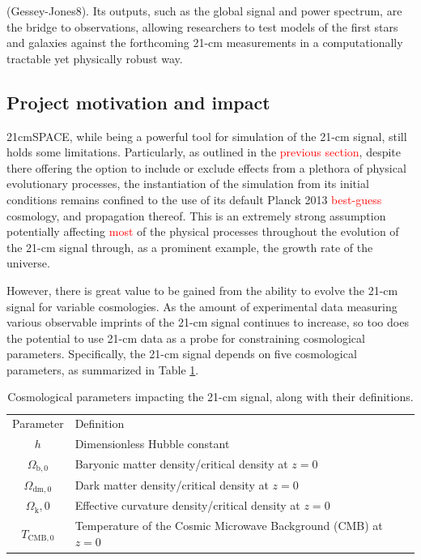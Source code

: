 \documentclass[floats,floatfix,showpacs,amssymb,prd,superscriptaddress,nofootinbib]{revtex4-2} %
\newcommand{\red}{\textcolor{red}}
\begin{document}
(Gessey-Jones8). Its outputs, such as the global signal and power spectrum, are the bridge to observations, allowing researchers to test models of the first stars and galaxies against the forthcoming 21-cm measurements in a computationally tractable yet physically robust way.


\subsection{Project motivation and impact}

21cmSPACE, while being a powerful tool for simulation of the 21-cm signal, still holds some limitations. Particularly, as outlined in the \red{previous section}, despite there offering the option to include or exclude effects from a plethora of physical evolutionary processes, the instantiation of the simulation from its initial conditions remains confined to the use of its default Planck 2013 \red{best-guess} cosmology, and propagation thereof. This is an extremely strong assumption potentially affecting \red{most} of the physical processes throughout the evolution of the 21-cm signal through, as a prominent example, the growth rate of the universe. 

However, there is great value to be gained from the ability to evolve the 21-cm signal for variable cosmologies. As the amount of experimental data measuring various observable imprints of the 21-cm signal continues to increase, so too does the potential to use 21-cm data as a probe for constraining cosmological parameters. Specifically, the 21-cm signal depends on five cosmological parameters, as summarized in Table \ref{tab:cosmological_parameters}.


\begin{table}
    \centering
    \begin{tabular}{|c|l|}
        \hline
        Parameter & Definition\\ \hhline{|=|=|}
        $h$ & Dimensionless Hubble constant \\ \hline
        $\Omega_{\text{b}, 0}$ & Baryonic matter density/critical density at $z = 0$ \\ \hline
        $\Omega_{\text{dm}, 0}$ & Dark matter density/critical density at $z = 0$\\ \hline
        $\Omega_{\text{k}}, 0$ & Effective curvature density/critical density at $z = 0$\\ \hline
        $T_{\text{CMB},0}$ & Temperature of the Cosmic Microwave Background (CMB) at $z = 0$\\ \hline
    \end{tabular}
    \caption{Cosmological parameters impacting the 21-cm signal, along with their definitions.}
    \label{tab:cosmological_parameters}
\end{table}
\end{document}
